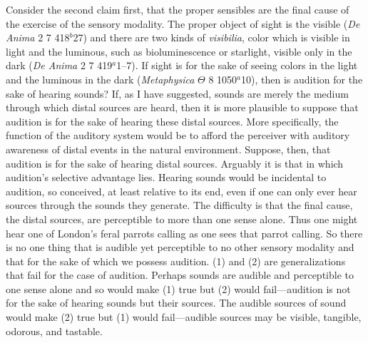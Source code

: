Consider the second claim first, that the proper sensibles are the final cause of the exercise of the sensory modality. The proper object of sight is the visible (\emph{De Anima} 2 7 418\( ^{b} \)27) and there are two kinds of \emph{visibilia}, color which is visible in light and the luminous, such as bioluminescence or starlight, visible only in the dark (\emph{De Anima} 2 7 419\( ^{a} \)1--7). If sight is for the sake of seeing colors in the light and the luminous in the dark (\emph{Metaphysica} \( \Theta \) 8 1050\( ^{a} \)10), then is audition for the sake of hearing sounds? If, as I have suggested, sounds are merely the medium through which distal sources are heard, then it is more plausible to suppose that audition is for the sake of hearing these distal sources. More specifically, the function of the auditory system would be to afford the perceiver with auditory awareness of distal events in the natural environment. Suppose, then, that audition is for the sake of hearing distal sources. Arguably it is that in which audition's selective advantage lies. Hearing sounds would be incidental to audition, so conceived, at least relative to its end, even if one can only ever hear sources through the sounds they generate. The difficulty is that the final cause, the distal sources, are perceptible to more than one sense alone. Thus one might hear one of London's feral parrots calling as one sees that parrot calling. So there is no one thing that is audible yet perceptible to no other sensory modality and that for the sake of which we possess audition. (1) and (2) are generalizations that fail for the case of audition. Perhaps sounds are audible and perceptible to one sense alone and so would make (1) true but (2) would fail---audition is not for the sake of hearing sounds but their sources. The audible sources of sound would make (2) true but (1) would fail---audible sources may be visible, tangible, odorous, and tastable.



